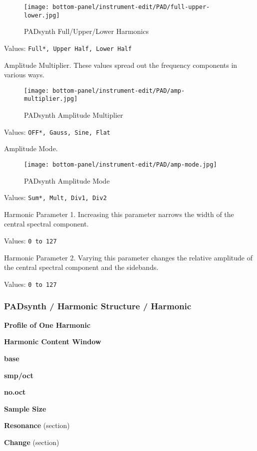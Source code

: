 \begin{figure}[H]
   \centering 
   \texttt{[image: bottom-panel/instrument-edit/PAD/full-upper-lower.jpg]}
   \caption{PADsynth Full/Upper/Lower Harmonics}
   \label{fig:padsynth_full_upper_lower}
\end{figure}

   Values: \texttt{Full*, Upper Half, Lower Half}

   Amplitude Multiplier.
   These values spread out the frequency components in various ways.

\begin{figure}[H]
   \centering 
   \texttt{[image: bottom-panel/instrument-edit/PAD/amp-multiplier.jpg]}
   \caption{PADsynth Amplitude Multiplier}
   \label{fig:padsynth_amplitude_multiplier}
\end{figure}

   Values: \texttt{OFF*, Gauss, Sine, Flat}

   Amplitude Mode.

\begin{figure}[H]
   \centering 
   \texttt{[image: bottom-panel/instrument-edit/PAD/amp-mode.jpg]}
   \caption{PADsynth Amplitude Mode}
   \label{fig:padsynth_amplitude_mode}
\end{figure}

   Values: \texttt{Sum*, Mult, Div1, Div2}

   Harmonic Parameter 1.
   Increasing this parameter narrows the width of the central spectral
   component.

   Values: \texttt{0 to 127}

   Harmonic Parameter 2.
   Varying this parameter changes the relative amplitude of the central
   spectral component and the sidebands.

   Values: \texttt{0 to 127}

\subsubsection{PADsynth / Harmonic Structure / Harmonic}
\label{subsubsec:padsynth_harmonic_structure_harmonic}

   \begin{enumber}
      \item \textbf{Profile of One Harmonic}
      \item \textbf{Harmonic Content Window}
      \item \textbf{base}
      \item \textbf{smp/oct}
      \item \textbf{no.oct}
      \item \textbf{Sample Size}
      \item \textbf{Resonance} (section)
      \item \textbf{Change} (section)
   \end{enumber}

